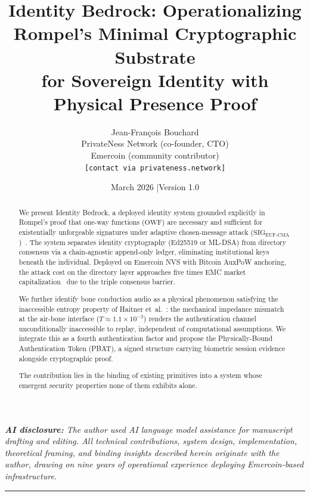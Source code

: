\documentclass[11pt,a4paper]{article}
\theoremstyle{definition}
\newcommand{\OWF}{\mathrm{OWF}}
\newcommand{\SIG}{\mathrm{SIG}}
\newcommand{\EUFCMA}{\mathrm{EUF\text{-}CMA}}
\newcommand{\PBAT}{\textsf{PBAT}}
\newcommand{\BD}{\textsf{Identity Bedrock}}
\begin{document}
\title{\textbf{Identity Bedrock: Operationalizing Rompel's Minimal
Cryptographic Substrate\\for Sovereign Identity with Physical Presence Proof}}

\author{
  Jean-Fran\c{c}ois Bouchard\\[4pt]
  \small PrivateNess Network (co-founder, CTO)\\
  \small Emercoin (community contributor)\\[4pt]
  \small \texttt{[contact via privateness.network]}
}

\date{March 2026 \quad|\quad Version 1.0}

\maketitle

\begin{center}
\small\itshape
\textbf{AI disclosure:} The author used AI language model assistance
for manuscript drafting and editing. All technical contributions,
system design, implementation, theoretical framing, and binding
insights described herein originate with the author, drawing on nine
years of operational experience deploying Emercoin-based infrastructure.
\end{center}

\vspace{4pt}\noindent\rule{\textwidth}{0.4pt}\vspace{2pt}

\begin{abstract}
We present \BD{}, a deployed identity system grounded explicitly in
Rompel's proof that one-way functions ($\OWF$) are necessary and
sufficient for existentially unforgeable signatures under adaptive
chosen-message attack ($\SIG_{\EUFCMA}$)~\cite{Rompel90}. The system
separates identity cryptography (Ed25519 or ML-DSA) from directory
consensus via a chain-agnostic append-only ledger, eliminating
institutional keys beneath the individual. Deployed on Emercoin NVS
with Bitcoin AuxPoW anchoring, the attack cost on the directory layer
approaches five times EMC market capitalization~\cite{Kho21} due to
the triple consensus barrier.

We further identify bone conduction audio as a physical phenomenon
satisfying the inaccessible entropy property of Haitner
et~al.~\cite{Haitner10}: the mechanical impedance mismatch at the
air-bone interface ($T \approx 1.1 \times 10^{-3}$) renders the
authentication channel unconditionally inaccessible to replay,
independent of computational assumptions. We integrate this as a
fourth authentication factor and propose the Physically-Bound
Authentication Token (\PBAT{}), a signed structure carrying biometric
session evidence alongside cryptographic proof.

The contribution lies in the binding of existing primitives into a
system whose emergent security properties none of them exhibits alone.
\end{abstract}
\end{document}
